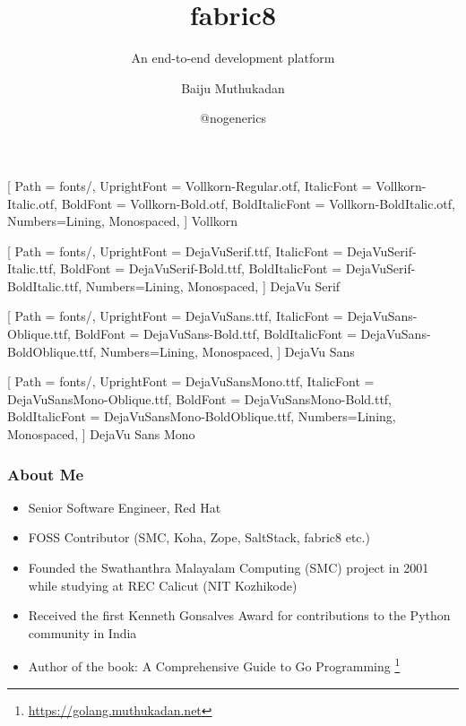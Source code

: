 \documentclass[aspectratio=169]{beamer}
\title{fabric8}
\subtitle{An end-to-end development platform}
\author{Baiju Muthukadan}
\institute{Red Hat}
\date{@nogenerics}
\begin{document}
\beamertemplatenavigationsymbolsempty

\setmainfont
[ Path = fonts/,
UprightFont = DejaVuSerif.ttf,
ItalicFont = DejaVuSerif-Italic.ttf,
BoldFont = DejaVuSerif-Bold.ttf,
BoldItalicFont = DejaVuSerif-BoldItalic.ttf,
Numbers={Lining, Monospaced},
] {DejaVu Serif}

\setsansfont
[ Path = fonts/,
UprightFont = DejaVuSans.ttf,
ItalicFont = DejaVuSans-Oblique.ttf,
BoldFont = DejaVuSans-Bold.ttf,
BoldItalicFont = DejaVuSans-BoldOblique.ttf,
Numbers={Lining, Monospaced},
] {DejaVu Sans}

\setmonofont
[ Path = fonts/,
UprightFont = DejaVuSansMono.ttf,
ItalicFont = DejaVuSansMono-Oblique.ttf,
BoldFont = DejaVuSansMono-Bold.ttf,
BoldItalicFont = DejaVuSansMono-BoldOblique.ttf,
Numbers={Lining, Monospaced},
] {DejaVu Sans Mono}


\newfontfamily{\vollkorn}
[ Path = fonts/,
UprightFont = Vollkorn-Regular.otf,
ItalicFont = Vollkorn-Italic.otf,
BoldFont = Vollkorn-Bold.otf,
BoldItalicFont = Vollkorn-BoldItalic.otf,
Numbers={Lining, Monospaced},
] {Vollkorn}

\newfontfamily{\dejavuserif}
[ Path = fonts/,
UprightFont = DejaVuSerif.ttf,
ItalicFont = DejaVuSerif-Italic.ttf,
BoldFont = DejaVuSerif-Bold.ttf,
BoldItalicFont = DejaVuSerif-BoldItalic.ttf,
Numbers={Lining, Monospaced},
] {DejaVu Serif}

\newfontfamily{\dejavusans}
[ Path = fonts/,
UprightFont = DejaVuSans.ttf,
ItalicFont = DejaVuSans-Oblique.ttf,
BoldFont = DejaVuSans-Bold.ttf,
BoldItalicFont = DejaVuSans-BoldOblique.ttf,
Numbers={Lining, Monospaced},
] {DejaVu Sans}

\newfontfamily{\dejavumono}
[ Path = fonts/,
UprightFont = DejaVuSansMono.ttf,
ItalicFont = DejaVuSansMono-Oblique.ttf,
BoldFont = DejaVuSansMono-Bold.ttf,
BoldItalicFont = DejaVuSansMono-BoldOblique.ttf,
Numbers={Lining, Monospaced},
] {DejaVu Sans Mono}

\frame{\titlepage}

\begin{frame}
  \frametitle{About Me}

  \begin{itemize}
  \item<1-> Senior Software Engineer, Red Hat
  \item<2-> FOSS Contributor (SMC, Koha, Zope, SaltStack, fabric8 etc.)
  \item<3-> Founded the Swathanthra Malayalam Computing (SMC) project in 2001 while studying at REC Calicut (NIT Kozhikode)
  \item<4-> Received the first Kenneth Gonsalves Award for contributions to the Python community in India
  \item<5-> Author of the book: A Comprehensive Guide to Go Programming \footnote{\url{https://golang.muthukadan.net}}
  \end{itemize}

\end{frame}
\end{document}
